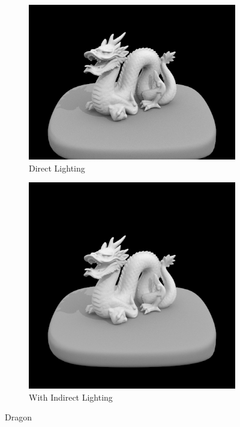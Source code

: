 \documentclass{article}
\begin{document}
\begin{figure}[htb!]
\begin{subfigure}[h]{0.4\textwidth}
\includegraphics[width=\textwidth]{task4/dragon_direct.png}
\caption{Direct Lighting}
\end{subfigure}
\hfill\vrule\hfill
\begin{subfigure}[h]{0.4\textwidth}
\includegraphics[width=\textwidth]{task4/dragon.png}
\caption{With Indirect Lighting}
\end{subfigure}%

\caption[f2]{Dragon}
\end{figure}
\end{document}
